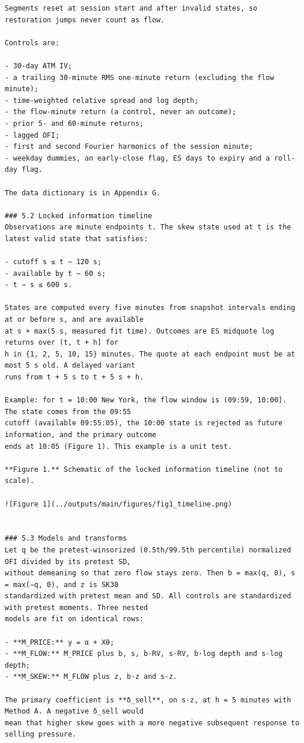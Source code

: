 \documentclass[11pt]{article}
\begin{document}
\begin{verbatim}
Segments reset at session start and after invalid states, so restoration jumps never count as flow.

Controls are:

- 30-day ATM IV;
- a trailing 30-minute RMS one-minute return (excluding the flow minute);
- time-weighted relative spread and log depth;
- the flow-minute return (a control, never an outcome);
- prior 5- and 60-minute returns;
- lagged OFI;
- first and second Fourier harmonics of the session minute;
- weekday dummies, an early-close flag, ES days to expiry and a roll-day flag.

The data dictionary is in Appendix G.

### 5.2 Locked information timeline
Observations are minute endpoints t. The skew state used at t is the latest valid state that satisfies:

- cutoff s ≤ t − 120 s;
- available by t − 60 s;
- t − s ≤ 600 s.

States are computed every five minutes from snapshot intervals ending at or before s, and are available
at s + max(5 s, measured fit time). Outcomes are ES midquote log returns over (t, t + h] for
h in {1, 2, 5, 10, 15} minutes. The quote at each endpoint must be at most 5 s old. A delayed variant
runs from t + 5 s to t + 5 s + h.

Example: for t = 10:00 New York, the flow window is (09:59, 10:00]. The state comes from the 09:55
cutoff (available 09:55:05), the 10:00 state is rejected as future information, and the primary outcome
ends at 10:05 (Figure 1). This example is a unit test.

**Figure 1.** Schematic of the locked information timeline (not to scale).

![Figure 1](../outputs/main/figures/fig1_timeline.png)


### 5.3 Models and transforms
Let q be the pretest-winsorized (0.5th/99.5th percentile) normalized OFI divided by its pretest SD,
without demeaning so that zero flow stays zero. Then b = max(q, 0), s = max(−q, 0), and z is SK30
standardized with pretest mean and SD. All controls are standardized with pretest moments. Three nested
models are fit on identical rows:

- **M_PRICE:** y = α + Xθ;
- **M_FLOW:** M_PRICE plus b, s, b·RV, s·RV, b·log depth and s·log depth;
- **M_SKEW:** M_FLOW plus z, b·z and s·z.

The primary coefficient is **δ_sell**, on s·z, at h = 5 minutes with Method A. A negative δ_sell would
mean that higher skew goes with a more negative subsequent response to selling pressure.


\end{verbatim}
\end{document}

